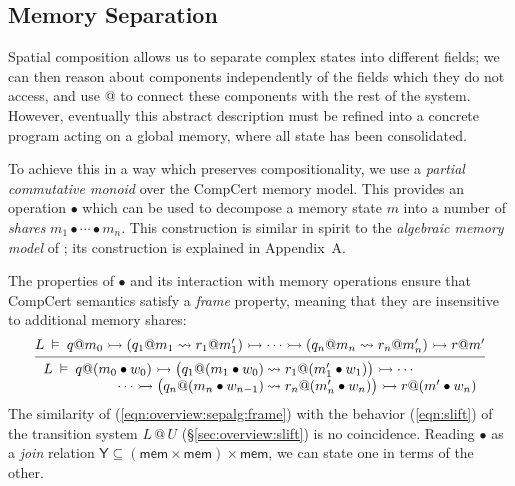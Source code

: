 \documentclass[acmsmall,screen,review,anonymous]{acmart}
\newcommand{\kw}[1]{\ensuremath{ \mathsf{#1} }}
\newcommand{\jr}{\mathsf{Y}}
\begin{document}

\subsection{Memory Separation} \label{sec:overview:sepalg} %

Spatial composition
allows us to separate
complex states into different fields;
we can then reason about components
independently of the fields which they do not access,
and use $\mathbin@$
to connect these components with the rest of the system.
However, eventually this abstract description
must be refined into a concrete program
acting on a global memory,
where all state has been consolidated.

To achieve this in a way which preserves compositionality,
we use a \emph{partial commutative monoid}
over the CompCert memory model.
This provides an operation $\bullet$
which can be used to decompose a memory state $m$ into
a number of \emph{shares}
$
  m_1 \bullet \cdots \bullet m_n
$.
This construction
is similar in spirit to the \emph{algebraic memory model}
of \citet{ccal};
its construction is explained in Appendix~A. %

The properties of $\bullet$
and its interaction with memory operations
ensure that CompCert semantics satisfy
a \emph{frame} property,
meaning that they are insensitive to
additional memory shares:
\begin{equation} \label{eqn:overview:sepalg:frame}
  \begin{prooftree}
  \hypo{
  L \:\vDash\: q@m_0 \rightarrowtail
    (q_1@m_1 \leadsto r_1@m_1') \rightarrowtail
    \cdots \rightarrowtail
    (q_n@m_n \leadsto r_n@m_n') \rightarrowtail
    r@m'}
  \infer1{
   {\begin{array}{r@{\:}l}
    L \:\vDash\: q@(m_0 \bullet w_0) \rightarrowtail
      \big( q_1@(m_1 \bullet w_0) &\leadsto r_1@(m_1' \bullet w_1) \big) \rightarrowtail
      \cdots \\ \cdots \rightarrowtail
      \big( q_n@(m_n \bullet w_{n-1}) &\leadsto r_n@(m_n' \bullet w_n) \big) \rightarrowtail
      r@(m' \bullet w_n)
   \end{array}} }
  \end{prooftree}
\end{equation}
The similarity of (\ref{eqn:overview:sepalg:frame})
with the behavior (\ref{eqn:slift})
of the transition system $L \mathbin@ U$ (\S\ref{sec:overview:slift})
is no coincidence.
Reading $\bullet$ as a \emph{join} relation
$\jr \subseteq (\kw{mem} \times \kw{mem}) \times \kw{mem}$,
we can state one in terms of the other.
\end{document}
